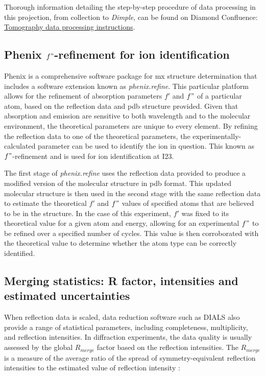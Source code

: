 Thorough information detailing the step-by-step procedure of data processing in this projection, from collection to \textit{Dimple}, can be found on Diamond Confluence: \href{https://confluence.diamond.ac.uk/x/yIWuD}{Tomography data processing instructions}. %

\subsection{Phenix $f"$-refinement for ion identification}

Phenix is a comprehensive software package for \ac{mx} structure determination that includes a software extension known as \textit{phenix.refine}. This particular platform allows for the refinement of absorption parameters $f'$ and $f"$ of a particular atom, based on the reflection data and \ac{pdb} structure provided. Given that absorption and emission are sensitive to both wavelength and to the molecular environment, the theoretical parameters are unique to every element. By refining the reflection data to one of the theoretical parameters, the experimentally-calculated parameter can be used to identify the ion in question. This known as $f"$-refinement and is used for ion identification at I23.

The first stage of \textit{phenix.refine} uses the reflection data provided to produce a modified version of the molecular structure in \ac{pdb} format. This updated molecular structure is then used in the second stage with the same reflection data to estimate the theoretical $f'$ and $f"$ values of specified atoms that are believed to be in the structure. In the case of this experiment, $f'$ was fixed to its theoretical value for a given atom and energy, allowing for an experimental $f"$ to be refined over a specified number of cycles. This value is then corroborated with the theoretical value to determine whether the atom type can be correctly identified.%

\subsection{Merging statistics: R factor, intensities and estimated uncertainties}

When reflection data is scaled, data reduction software such as DIALS also provide a range of statistical parameters, including completeness, multiplicity, and reflection intensities. In diffraction experiments, the data quality is usually assessed by the global $R_{merge}$ factor based on the reflection intensities. The $R_{merge}$ is a measure of the average ratio of the spread of symmetry-equivalent reflection intensities to the estimated value of reflection intensity \cite{Dauter1999}:

